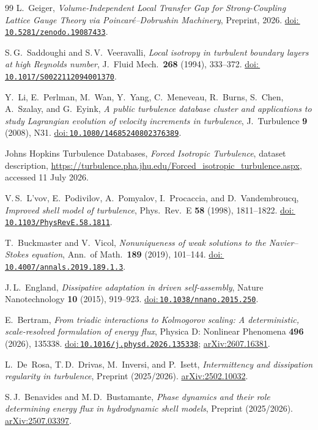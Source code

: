 \documentclass[12pt,a4paper]{article}
\newcommand{\doilink}[1]{\href{https://doi.org/#1}{doi:\,\nolinkurl{#1}}}
\theoremstyle{breakdef}
\theoremstyle{breakplain}
\theoremstyle{breakdef}
\begin{document}
\begin{thebibliography}{99}
L.~Geiger, \textit{Volume-Independent Local Transfer Gap for Strong-Coupling Lattice Gauge Theory via Poincaré--Dobrushin Machinery}, Preprint, 2026.
\doilink{10.5281/zenodo.19087433}.

S.\,G.~Saddoughi and S.\,V.~Veeravalli,
\emph{Local isotropy in turbulent boundary layers at high Reynolds number},
J.~Fluid Mech.\ \textbf{268} (1994), 333--372.
\doilink{10.1017/S0022112094001370}.

Y.~Li, E.~Perlman, M.~Wan, Y.~Yang, C.~Meneveau, R.~Burns, S.~Chen,
A.~Szalay, and G.~Eyink,
\emph{A public turbulence database cluster and applications to study
Lagrangian evolution of velocity increments in turbulence},
J.~Turbulence \textbf{9} (2008), N31.
\doilink{10.1080/14685240802376389}.

Johns Hopkins Turbulence Databases,
\emph{Forced Isotropic Turbulence}, dataset description,
\url{https://turbulence.pha.jhu.edu/Forced_isotropic_turbulence.aspx},
accessed 11 July 2026.

V.\,S.~L'vov, E.~Podivilov, A.~Pomyalov, I.~Procaccia,
and D.~Vandembroucq,
\emph{Improved shell model of turbulence},
Phys.\ Rev.\ E \textbf{58} (1998), 1811--1822.
\doilink{10.1103/PhysRevE.58.1811}.

T.~Buckmaster and V.~Vicol,
\emph{Nonuniqueness of weak solutions to the Navier--Stokes equation},
Ann.\ of Math.\ \textbf{189} (2019), 101--144.
\doilink{10.4007/annals.2019.189.1.3}.

J.\,L.~England,
\emph{Dissipative adaptation in driven self-assembly},
Nature Nanotechnology \textbf{10} (2015), 919--923.
\doilink{10.1038/nnano.2015.250}.


E.~Bertram,
\emph{From triadic interactions to Kolmogorov scaling: A deterministic, scale-resolved formulation of energy flux},
Physica D: Nonlinear Phenomena \textbf{496} (2026), 135338.
\doilink{10.1016/j.physd.2026.135338};
\href{https://arxiv.org/abs/2607.16381}{arXiv:2607.16381}.

L.~De~Rosa, T.\,D.~Drivas, M.~Inversi, and P.~Isett,
\emph{Intermittency and dissipation regularity in turbulence},
Preprint (2025/2026).
\href{https://arxiv.org/abs/2502.10032}{arXiv:2502.10032}.

S.\,J.~Benavides and M.\,D.~Bustamante,
\emph{Phase dynamics and their role determining energy flux in hydrodynamic shell models},
Preprint (2025/2026).
\href{https://arxiv.org/abs/2507.03397}{arXiv:2507.03397}.


\end{thebibliography}
\end{document}

